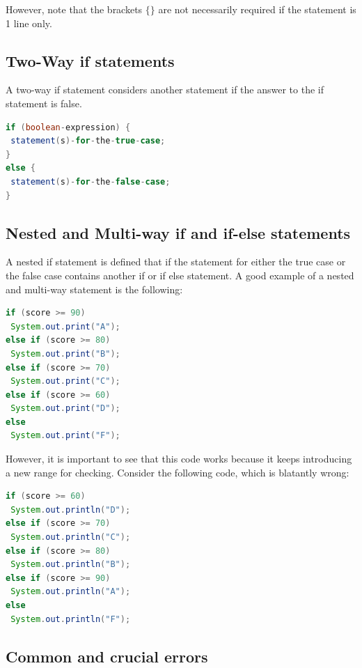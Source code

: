 \documentclass[11pt,a4 paper]{book}
\theoremstyle{plain}
\theoremstyle{definition}
\theoremstyle{remark}
\begin{document}
\begin{flushleft}
\begin{figure}[H]
\end{figure} 
However, note that the brackets $\{\}$ are not necessarily required if the statement is 1 line only.
\subsection{Two-Way if statements}
A two-way if statement considers another statement if the answer to the if statement is false.
\begin{lstlisting}[language=Java]
if (boolean-expression) {
 statement(s)-for-the-true-case;
}
else {
 statement(s)-for-the-false-case;
} 
\end{lstlisting}
\subsection{Nested and Multi-way if and if-else statements}
A nested if statement is defined that if the statement for either the true case or the false case contains another if or if else statement. 
A good example of a nested and multi-way statement is the following:
\begin{lstlisting}[language=Java]
if (score >= 90)
 System.out.print("A");
else if (score >= 80)
 System.out.print("B");
else if (score >= 70)
 System.out.print("C");
else if (score >= 60)
 System.out.print("D"); 
else
 System.out.print("F");
\end{lstlisting}
However, it is important to see that this code works because it keeps introducing a new range for checking. Consider the following code, which is blatantly wrong:
\begin{lstlisting}[language=Java]
if (score >= 60)
 System.out.println("D");
else if (score >= 70)
 System.out.println("C");
else if (score >= 80)
 System.out.println("B");
else if (score >= 90)
 System.out.println("A");
else
 System.out.println("F");
\end{lstlisting}
\subsection{Common and crucial errors}

\end{flushleft}
\end{document}
